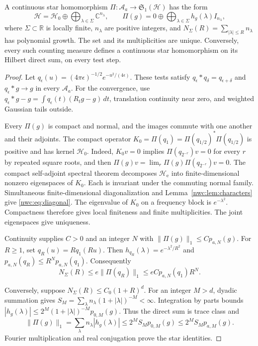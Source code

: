 \begin{theorem}\label{nwc:thm:classification}
A continuous star homomorphism
$\Pi:\mathcal A_a\to\mathfrak S_1(\mathcal H)$ has the form
\begin{equation}\label{nwc:eq:diagonal}
 \mathcal H=\mathcal H_0\oplus
     \bigoplus_{\lambda\in\Sigma}\mathbb C^{n_\lambda},\qquad
 \Pi(g)=0\oplus\bigoplus_{\lambda\in\Sigma}h_g(\lambda)I_{n_\lambda},
\end{equation}
where $\Sigma\subset\mathbb R$ is locally finite,
$n_\lambda$ are positive integers, and
$N_\Sigma(R)=\sum_{|\lambda|\leq R}n_\lambda$ has polynomial growth.
The set and its multiplicities are unique.
Conversely, every such counting measure defines a continuous star
homomorphism on its Hilbert direct sum, on every test step.
\end{theorem}
\begin{proof}
Let $q_\epsilon(u)=(4\pi\epsilon)^{-1/2}e^{-u^2/(4\epsilon)}$.
These tests satisfy $q_\epsilon*q_\delta=q_{\epsilon+\delta}$ and
$q_\epsilon*g\to g$ in every $\mathcal A_a$.
For the convergence, use
$q_\epsilon*g-g=\int q_\epsilon(t)(R_tg-g)\,dt$,
translation continuity near zero, and weighted Gaussian tails outside.

Every $\Pi(g)$ is compact and normal, and the images commute with
one another and their adjoints. The compact operator
$K_0=\Pi(q_1)=\Pi(q_{1/2})^*\Pi(q_{1/2})$ is positive and
has kernel $\mathcal H_0$.
Indeed, $K_0v=0$ implies $\Pi(q_{2^{-r}})v=0$ for every $r$ by
repeated square roots, and then
$\Pi(g)v=\lim_r\Pi(g)\Pi(q_{2^{-r}})v=0$.
The compact self-adjoint spectral theorem decomposes
$\mathcal H_{\mathrm e}$ into finite-dimensional nonzero eigenspaces
of $K_0$. Each is invariant under the commuting normal family.
Simultaneous finite-dimensional diagonalization and
Lemma~\ref{nwc:lem:characters} give \eqref{nwc:eq:diagonal}.
The eigenvalue of $K_0$ on a frequency block is $e^{-\lambda^2}$.
Compactness therefore gives local finiteness and finite multiplicities.
The joint eigenspaces give uniqueness.

Continuity supplies $C>0$ and an integer $N$ with
$\|\Pi(g)\|_1\leq Cp_{a,N}(g)$.
For $R\geq1$, set $q_R(u)=Rq_1(Ru)$.
Then $h_{q_R}(\lambda)=e^{-\lambda^2/R^2}$ and
$p_{a,N}(q_R)\leq R^Np_{a,N}(q_1)$.
Consequently
\begin{equation}\label{nwc:eq:counting-necessity}
 N_\Sigma(R)\leq e\|\Pi(q_R)\|_1
              \leq eCp_{a,N}(q_1)R^N.
\end{equation}

Conversely, suppose $N_\Sigma(R)\leq C_0(1+R)^d$.
For an integer $M>d$, dyadic summation gives
$S_M=\sum_\lambda n_\lambda(1+|\lambda|)^{-M}<\infty$.
Integration by parts bounds
$|h_g(\lambda)|\leq2^M(1+|\lambda|)^{-M}p_{0,M}(g)$.
Thus the direct sum is trace class and
\begin{equation}\label{nwc:eq:trace-bound}
 \|\Pi(g)\|_1=\sum_\lambda n_\lambda|h_g(\lambda)|
             \leq2^MS_Mp_{0,M}(g)\leq2^MS_Mp_{a,M}(g).
\end{equation}
Fourier multiplication and real conjugation prove the star identities.
\end{proof}

